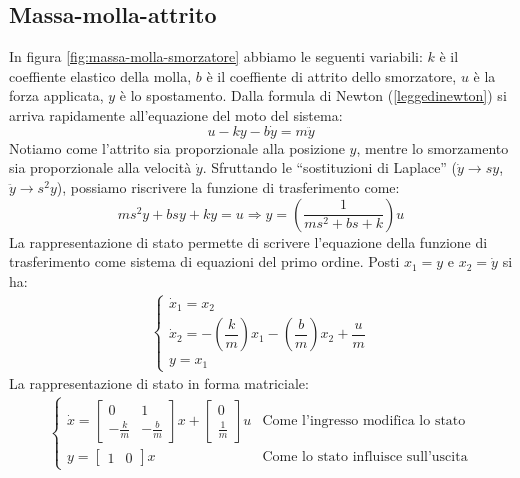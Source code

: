 \documentclass[a4paper]{report}
\begin{document}
\subsection{Massa-molla-attrito}
In figura \ref{fig:massa-molla-smorzatore} abbiamo le seguenti variabili:
$k$ \`e il coeffiente elastico della molla, $b$ \`e il coeffiente di
attrito dello smorzatore, $u$ \`e la forza applicata, $y$ \`e lo
spostamento. Dalla formula di Newton (\ref{leggedinewton}) si arriva rapidamente
all'equazione del moto del sistema:
\begin{equation}\label{massa-molla-attrito}
u -ky -b\dot{y} = m \ddot{y}
\end{equation}
Notiamo come l'attrito sia proporzionale alla posizione $y$, mentre lo
smorzamento sia proporzionale alla velocit\`a $\dot{y}$. Sfruttando le
``sostituzioni di Laplace'' ($\dot{y} \rightarrow sy$, $\ddot{y}
\rightarrow s^2y$), possiamo riscrivere la funzione di trasferimento come:
$$m s^2 y + b s y + k y = u \Rightarrow y = \left ( \frac{1}{m s^2 +
  bs + k} \right )u$$
La rappresentazione di stato permette di scrivere l'equazione della
funzione di trasferimento come sistema di equazioni del primo
ordine. Posti $x_1 = y$ e $x_2 = \dot{y}$ si ha:
\begin{eqnarray*}
  \left\{ \begin{array}{l}
    \dot{x}_1 = x_2\\
    \dot{x}_2 = -\left(\dfrac{k}{m}\right)x_1 - \left(\dfrac{b}{m}\right)x_2 + \dfrac{u}{m}\\
    y = x_1
    \end{array}\right .
\end{eqnarray*}
La rappresentazione di stato in forma matriciale:
\begin{eqnarray*}
  \left\{ \begin{array}{lr}
    \dot{x} = \begin{bmatrix}0 & 1\\-\frac{k}{m} &
      -\frac{b}{m}\end{bmatrix}x
    + \begin{bmatrix}0\\ \frac{1}{m}\end{bmatrix}u & \textrm{Come
      l'ingresso modifica lo stato}\\
    y = \begin{bmatrix}1 & 0\end{bmatrix}x & \textrm{Come lo stato
        influisce sull'uscita}
    \end{array}\right .
\end{eqnarray*}
\end{document}
